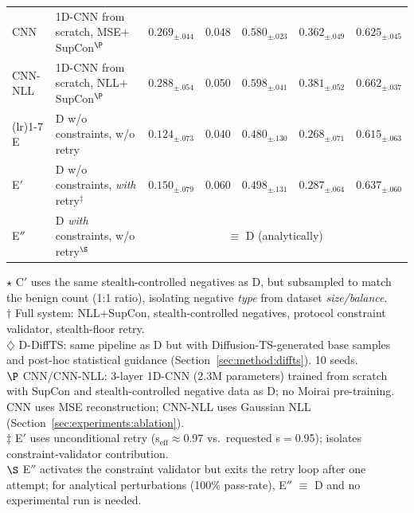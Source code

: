 \begin{table}[h]
{\begin{tabular}{llccccc}
CNN    & 1D-CNN from scratch, MSE$+$SupCon$^\P$             & $0.269_{\pm.044}$ & $0.048$ & $0.580_{\pm.023}$ & $0.362_{\pm.049}$ & $0.625_{\pm.045}$ \\
CNN-NLL & 1D-CNN from scratch, NLL$+$SupCon$^\P$            & $0.288_{\pm.054}$ & $0.050$ & $0.598_{\pm.041}$ & $0.381_{\pm.052}$ & $0.662_{\pm.037}$ \\
\addlinespace[3pt]
\cmidrule(lr){1-7}
\addlinespace[1pt]
E      & D w/o constraints, w/o retry                       & $0.124_{\pm.073}$ & $0.040$ & $0.480_{\pm.130}$ & $0.268_{\pm.071}$ & $0.615_{\pm.063}$ \\
E$'$   & D w/o constraints, \emph{with} retry$^\ddagger$    & $0.150_{\pm.079}$ & $0.060$ & $0.498_{\pm.131}$ & $0.287_{\pm.064}$ & $0.637_{\pm.060}$ \\
E$''$ & D \emph{with} constraints, w/o retry$^\S$     & \multicolumn{5}{c}{$\equiv$ D (analytically)} \\
\bottomrule
\end{tabular}%
}
\vspace{2pt}
\begin{flushleft}
\footnotesize
$\star$ C$'$ uses the same stealth-controlled negatives as D, but subsampled to match the benign count (1:1 ratio), isolating negative \emph{type} from dataset \emph{size/balance}. \\
$\dagger$ Full system: NLL$+$SupCon, stealth-controlled negatives, protocol constraint validator, stealth-floor retry. \\
$\diamondsuit$ D-DiffTS: same pipeline as D but with Diffusion-TS-generated base samples and post-hoc statistical guidance (Section~\ref{sec:method:diffts}). 10 seeds. \\
$\P$ CNN/CNN-NLL: 3-layer 1D-CNN (2.3M parameters) trained from scratch with SupCon and stealth-controlled negative data as D; no Moirai pre-training. CNN uses MSE reconstruction; CNN-NLL uses Gaussian NLL (Section~\ref{sec:experiments:ablation}). \\
$\ddagger$ E$'$ uses unconditional retry (s$_{\text{eff}}\approx$0.97 vs.\ requested s$=$0.95); isolates constraint-validator contribution. \\
$\S$ E$''$ activates the constraint validator but exits the retry loop after one attempt; for analytical perturbations (100\% pass-rate), E$''$ $\equiv$ D and no experimental run is needed.
\end{flushleft}
\end{table}
